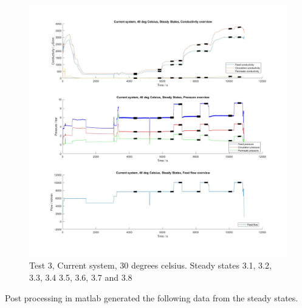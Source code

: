 \begin{figure}[H]
    \centering
    \includegraphics[width=1.1\textwidth]{overview40}
    \caption{Test 3, Current system, 30 degrees celsius. Steady states 3.1, 3.2, 3.3, 3.4 3.5, 3.6, 3.7 and 3.8}
    \label{fig:overw40}
\end{figure}

\newpage

Post processing in matlab generated the following data from the steady states.

